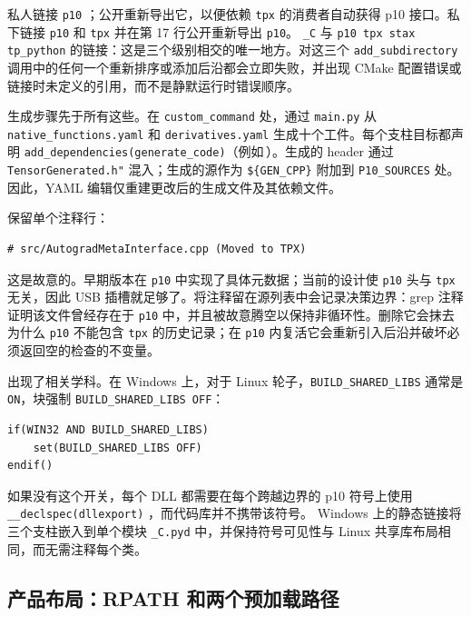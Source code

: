 私人链接 \texttt{p10} ；公开重新导出它，以便依赖 \texttt{tpx} 的消费者自动获得 p10 接口。私下链接 \texttt{p10} 和 \texttt{tpx} 并在第 17 行公开重新导出 \texttt{p10}。 \texttt{\_C} 与 \texttt{p10 tpx stax tp\_python} 的链接：这是三个级别相交的唯一地方。对这三个 \texttt{add\_subdirectory} 调用中的任何一个重新排序或添加后沿都会立即失败，并出现 CMake 配置错误或链接时未定义的引用，而不是静默运行时错误顺序。

生成步骤先于所有这些。在 \texttt{custom\_command} 处，通过 \texttt{main.py} 从 \texttt{native\_functions.yaml} 和 \texttt{derivatives.yaml} 生成十个工件。每个支柱目标都声明 \texttt{add\_dependencies(generate\_code)}（例如\,）。生成的 header 通过 \texttt{TensorGenerated.h"} 混入；生成的源作为 \texttt{\$\{GEN\_CPP\}} 附加到 \texttt{P10\_SOURCES} 处。因此，YAML 编辑仅重建更改后的生成文件及其依赖文件。

保留单个注释行：

\begin{lstlisting}[caption={The vacated-source comment in the p10 build file: metadata that once violated the axiom was physically moved out, leaving this trail.}, label=lst:audittrail]
    # src/AutogradMetaInterface.cpp (Moved to TPX)
\end{lstlisting}

这是故意的。早期版本在 \texttt{p10} 中实现了具体元数据；当前的设计使 \texttt{p10} 头与 \texttt{tpx} 无关，因此 USB 插槽就足够了。将注释留在源列表中会记录决策边界：grep 注释证明该文件曾经存在于 \texttt{p10} 中，并且被故意腾空以保持非循环性。删除它会抹去为什么 \texttt{p10} 不能包含 \texttt{tpx} 的历史记录；在 \texttt{p10} 内复活它会重新引入后沿并破坏必须返回空的检查的不变量。

出现了相关学科。在 Windows 上，对于 Linux 轮子，\texttt{BUILD\_SHARED\_LIBS} 通常是 \texttt{ON}，块强制 \texttt{BUILD\_SHARED\_LIBS OFF}：

\begin{lstlisting}[caption={Windows static embedding.}, label=lst:winstatic]
if(WIN32 AND BUILD_SHARED_LIBS)
    set(BUILD_SHARED_LIBS OFF)
endif()
\end{lstlisting}

如果没有这个开关，每个 DLL 都需要在每个跨越边界的 p10 符号上使用 \texttt{\_\_declspec(dllexport)} ，而代码库并不携带该符号。 Windows 上的静态链接将三个支柱嵌入到单个模块 \texttt{\_C.pyd} 中，并保持符号可见性与 Linux 共享库布局相同，而无需注释每个类。

\subsection{产品布局：RPATH 和两个预加载路径}
\label{sec:arch:rpath}

